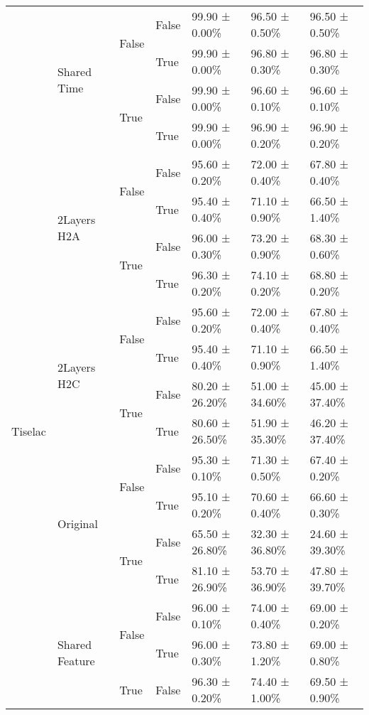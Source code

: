 \begin{tabular}{lllllll}
\cline{2-7} \cline{3-7}
 & \multirow[t]{4}{*}{Shared Time} & \multirow[t]{2}{*}{False} & False & 99.90 ± 0.00\% & 96.50 ± 0.50\% & 96.50 ± 0.50\% \\
 &  &  & True & 99.90 ± 0.00\% & 96.80 ± 0.30\% & 96.80 ± 0.30\% \\
\cline{3-7}
 &  & \multirow[t]{2}{*}{True} & False & 99.90 ± 0.00\% & 96.60 ± 0.10\% & 96.60 ± 0.10\% \\
 &  &  & True & 99.90 ± 0.00\% & 96.90 ± 0.20\% & 96.90 ± 0.20\% \\
\cline{1-7} \cline{2-7} \cline{3-7}
\multirow[t]{20}{*}{Tiselac} & \multirow[t]{4}{*}{2Layers H2A} & \multirow[t]{2}{*}{False} & False & 95.60 ± 0.20\% & 72.00 ± 0.40\% & 67.80 ± 0.40\% \\
 &  &  & True & 95.40 ± 0.40\% & 71.10 ± 0.90\% & 66.50 ± 1.40\% \\
\cline{3-7}
 &  & \multirow[t]{2}{*}{True} & False & 96.00 ± 0.30\% & 73.20 ± 0.90\% & 68.30 ± 0.60\% \\
 &  &  & True & 96.30 ± 0.20\% & 74.10 ± 0.20\% & 68.80 ± 0.20\% \\
\cline{2-7} \cline{3-7}
 & \multirow[t]{4}{*}{2Layers H2C} & \multirow[t]{2}{*}{False} & False & 95.60 ± 0.20\% & 72.00 ± 0.40\% & 67.80 ± 0.40\% \\
 &  &  & True & 95.40 ± 0.40\% & 71.10 ± 0.90\% & 66.50 ± 1.40\% \\
\cline{3-7}
 &  & \multirow[t]{2}{*}{True} & False & 80.20 ± 26.20\% & 51.00 ± 34.60\% & 45.00 ± 37.40\% \\
 &  &  & True & 80.60 ± 26.50\% & 51.90 ± 35.30\% & 46.20 ± 37.40\% \\
\cline{2-7} \cline{3-7}
 & \multirow[t]{4}{*}{Original} & \multirow[t]{2}{*}{False} & False & 95.30 ± 0.10\% & 71.30 ± 0.50\% & 67.40 ± 0.20\% \\
 &  &  & True & 95.10 ± 0.20\% & 70.60 ± 0.40\% & 66.60 ± 0.30\% \\
\cline{3-7}
 &  & \multirow[t]{2}{*}{True} & False & 65.50 ± 26.80\% & 32.30 ± 36.80\% & 24.60 ± 39.30\% \\
 &  &  & True & 81.10 ± 26.90\% & 53.70 ± 36.90\% & 47.80 ± 39.70\% \\
\cline{2-7} \cline{3-7}
 & \multirow[t]{4}{*}{Shared Feature} & \multirow[t]{2}{*}{False} & False & 96.00 ± 0.10\% & 74.00 ± 0.40\% & 69.00 ± 0.20\% \\
 &  &  & True & 96.00 ± 0.30\% & 73.80 ± 1.20\% & 69.00 ± 0.80\% \\
\cline{3-7}
 &  & \multirow[t]{2}{*}{True} & False & 96.30 ± 0.20\% & 74.40 ± 1.00\% & 69.50 ± 0.90\% \\

\end{tabular}
